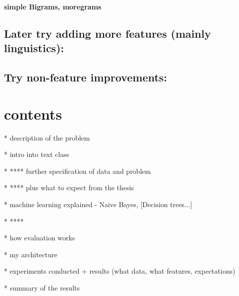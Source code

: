 \bf simple Bigrams, moregrams\rm
{}

\subsection{Later try adding more features (mainly linguistics):}






\subsection{Try non-feature improvements:}






\section{contents}

* description of the problem

* intro into text class

* **** further specification of data and problem

* **** plus what to expect from the thesis

* machine learning explained - Naive Bayes, [Decision trees...]

* ****\todoB[PCA...]

* how evaluation works

* my architecture

* experiments conducted + results (what data, what features, expectations) 

* summary of the results
